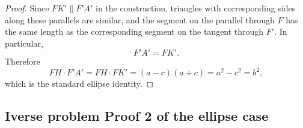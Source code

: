 \begin{proof}
  Since $FK' \parallel F'A'$ in the construction, triangles with corresponding sides along these parallels are similar, and the segment on the parallel through $F$ has the same length as the corresponding segment on the tangent through $F'$. In particular,
  \begin{equation}
    F'\!A' = FK'.
  \end{equation}
  Therefore
  \begin{equation}
    FH\cdot F'\!A' = FH\cdot FK' = (a-c)(a+c)=a^2-c^2=b^2,
  \end{equation}
  which is the standard ellipse identity.
\end{proof}


\subsection{Iverse problem Proof 2 of the ellipse case}

